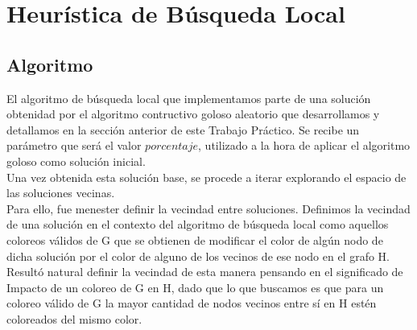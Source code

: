 \section{Heurística de Búsqueda Local}

\subsection{Algoritmo}


\indent El algoritmo de búsqueda local que implementamos parte de una solución obtenidad por el algoritmo contructivo goloso aleatorio que desarrollamos y detallamos en la sección anterior de este Trabajo Práctico. Se recibe un parámetro que será el valor $porcentaje$, utilizado a la hora de aplicar el algoritmo goloso como solución inicial.\\
\indent Una vez obtenida esta solución base, se procede a iterar explorando el espacio de las soluciones vecinas.\\
\indent Para ello, fue menester definir la vecindad entre soluciones. Definimos la vecindad de una solución en el contexto del algoritmo de búsqueda local como aquellos coloreos válidos de G que se obtienen de modificar el color de algún nodo de dicha solución por el color de alguno de los vecinos de ese nodo en el grafo H. Resultó natural definir la vecindad de esta manera pensando en el significado de Impacto de un coloreo de G en H, dado que lo que buscamos es que para un coloreo válido de G la mayor cantidad de nodos vecinos entre sí en H estén coloreados del mismo color.\\

